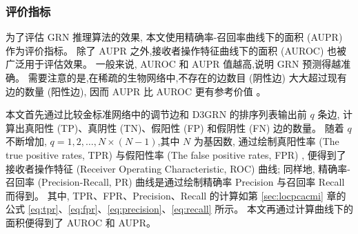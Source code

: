 \begin{table}[!htbp]
\centering
\caption{实验数据集详情}

\label{datasets}
\end{table}

\subsubsection{评价指标}

为了评估 GRN 推理算法的效果, 本文使用精确率-召回率曲线下的面积 (AUPR) 作为评价指标。
除了 AUPR 之外,接收者操作特征曲线下的面积 (AUROC) 也被广泛用于评估效果。
一般来说, AUROC 和 AUPR 值越高,说明 GRN 预测得越准确。
需要注意的是,在稀疏的生物网络中,不存在的边数目 (阴性边) 大大超过现有边的数量 (阳性边),
因而 AUPR 比 AUROC 更有参考价值  。

本文首先通过比较金标准网络中的调节边和 D3GRN 的排序列表输出前 $q$ 条边,
计算出真阳性 (TP)、真阴性 (TN)、假阳性 (FP) 和假阴性 (FN) 边的数量。
随着 $q$ 不断增加, $q = 1,2,\ldots,N\times(N-1)$,其中 $N$ 为基因数,
通过绘制真阳性率 (The true positive rates, TPR) 与假阳性率 (The false positive rates, FPR) ,
便得到了接收者操作特征 (Receiver Operating Characteristic, ROC) 曲线; 
同样地,
精确率-召回率 (Precision-Recall, PR) 曲线是通过绘制精确率 Precision 与召回率 Recall 而得到。
其中, TPR、FPR、Precision、Recall 的计算如第 \ref{sec:locpcacmi} 章的公式 \ref{eq:tpr}、\ref{eq:fpr}、\ref{eq:precision}、\ref{eq:recall} 所示。
本文再通过计算曲线下的面积便得到了 AUROC 和 AUPR。

